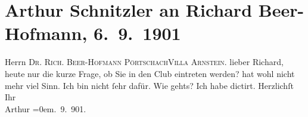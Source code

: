 

         
         \renewcommand{\erwaehntePersonen}{Personen: Richard Beer-Hofmann}
         \renewcommand{\erwaehnteInstitutionen}{Institutionen: Wiener Schachclub}
         \renewcommand{\erwaehnteOrte}{Orte: IX., Alsergrund, Pörtschach, Villa Arnstein, Wien}
         \renewcommand{\erwaehnteWerke}{}
               \section[Arthur Schnitzler an Richard Beer-Hofmann, 6. 9. 1901]{ Arthur Schnitzler an Richard Beer-Hofmann, 6. 9. 1901}\nopagebreak{}\rehead{ }\begin{ledgroupsized}[t]{13cm}\normalsize\beginnumbering \toendnotes[C]{\smallbreak\pagebreak[2]} 
\toendnotes[C]{\smallbreak}\pstart{}{\pb}Herrn \textsc{Dr. Rich. Beer-Hofmann
                  }\pend{}\pstart{}\textsc{Pörtschach}\pend{}\pstart{}\textsc{Villa Arnstein.}\pend{}{\bigskip}\pstart
           \noindent{}{\pb}lieber Richard, heute nur die kurze Frage, ob Sie in den Club eintreten werden? hat wohl
               nicht mehr viel Sinn. Ich bin nicht ſehr dafür. Wie gehts? Ich habe dictirt.\pend
           \pstart
           Herzlichſt Ihr{\\[\baselineskip]}\spacefill\mbox{Arthur}\pend
           \leftskip=0em{}. 9. 901.\pend
           
         
         \endnumbering{}\end{ledgroupsized}  \newcommand{\dateiname}{L01167}\newcommand{\titel}{Arthur Schnitzler an Richard Beer-Hofmann, 6. 9. 1901}\newcommand{\editorInnen}{Martin Anton Müller und Gerd-Hermann Susen}
      